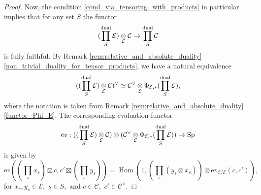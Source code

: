 \documentclass[11pt,leqno]{amsart}
\numberwithin{equation}{section}
\def\Hom{\operatorname{Hom}}
\newcommand{\tens}[1]{%
  \mathbin{\mathop{\otimes}\displaylimits_{#1}}%
}
\newcommand{\prodd}[1][]{\mathop{\prod}\limits_{#1}}
\newcommand{\dual}{\operatorname{dual}}
\newcommand{\ev}{\mathrm ev}
\newcommand{\cC}{{\mathcal C}}
\newcommand{\cE}{{\mathcal E}}
\newcommand{\Sp}{\operatorname{Sp}}
\begin{document}
\begin{proof}
Now, the condition \ref{cond_via_tensoring_with_products} in particular implies that for any set $S$ the functor
\begin{equation}\label{eq:fully_faithful_comparison}
(\prodd[S]^{\dual}\cE)\tens{\cE}\cC\to \prodd[S]^{\dual}\cC
\end{equation}
is fully faithful. By Remark \ref{rem:relative_and_absolute_duality} \ref{non_trivial_duality_for_tensor_products}, we have a natural equivalence
\begin{equation*}
((\prodd[S]^{\dual}\cE)\tens{\cE}\cC)^{\vee}\simeq \cC^{\vee}\tens{\cE}\Phi_{\cE,*}(\prodd[S]^{\dual}\cE),
\end{equation*}
where the notation is taken from Remark \ref{rem:relative_and_absolute_duality} \ref{functor_Phi_E}.
The corresponding evaluation functor
\begin{equation*}
\ev:((\prodd[S]^{\dual}\cE)\tens{\cE}\cC)\otimes (\cC^{\vee}\tens{\cE}\Phi_{\cE,*}(\prodd[S]^{\dual}\cE))\to\Sp
\end{equation*}
 is given by
\begin{equation}\label{eq:first_evaluation}
\ev((\prodd[s]x_s)\boxtimes c,c'\boxtimes(\prodd[s]y_s)) = \Hom(1,(\prodd[s](y_s\otimes x_s))\otimes \ev_{\cC/\cE}(c,c')),
\end{equation}
for $x_s,y_s\in\cE,$ $s\in S,$ and $c\in\cC,$ $c'\in\cC^{\vee}.$ 


\end{proof}
\end{document}
